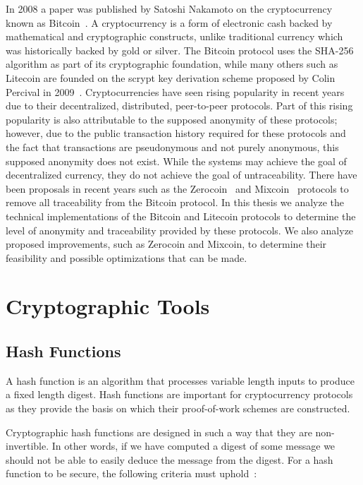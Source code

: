 \documentclass[11pt]{article}
\begin{document}
In 2008 a paper was published by Satoshi Nakamoto on the cryptocurrency known as Bitcoin~\cite{nakamoto08}.  A
cryptocurrency is a form of electronic cash backed by mathematical and cryptographic constructs, unlike traditional
currency which was historically backed by gold or silver. The Bitcoin protocol uses the SHA-256 algorithm as part of its
cryptographic foundation, while many others such as Litecoin are founded on the scrypt key derivation scheme proposed by
Colin Percival in 2009~\cite{percival09}.  Cryptocurrencies have seen rising popularity in recent years due to their
decentralized, distributed, peer-to-peer protocols. Part of this rising popularity is also attributable to the supposed
anonymity of these protocols; however, due to the public transaction history required for these protocols and the fact
that transactions are pseudonymous and not purely anonymous, this supposed anonymity does not exist. While the systems
may achieve the goal of decentralized currency, they do not achieve the goal of untraceability. There have been
proposals in recent years such as the Zerocoin~\cite{miers13} and Mixcoin~\cite{bonneau14} protocols to remove all
traceability from the Bitcoin protocol. In this thesis we analyze the technical implementations of the Bitcoin and
Litecoin protocols to determine the level of anonymity and traceability provided by these protocols. We also analyze
proposed improvements, such as Zerocoin and Mixcoin, to determine their feasibility and possible optimizations that can
be made.

\section{Cryptographic Tools}

\subsection{Hash Functions} A hash function is an algorithm that processes variable length inputs to produce a fixed
length digest. Hash functions are important for cryptocurrency protocols as they provide the basis on which their
proof-of-work schemes are constructed.

Cryptographic hash functions are designed in such a way that they are non-invertible. In other words, if we have
computed a digest of some message we should not be able to easily deduce the message from the digest. For a hash
function to be secure, the following criteria must uphold~\cite{rogaway04}:
\end{document}
